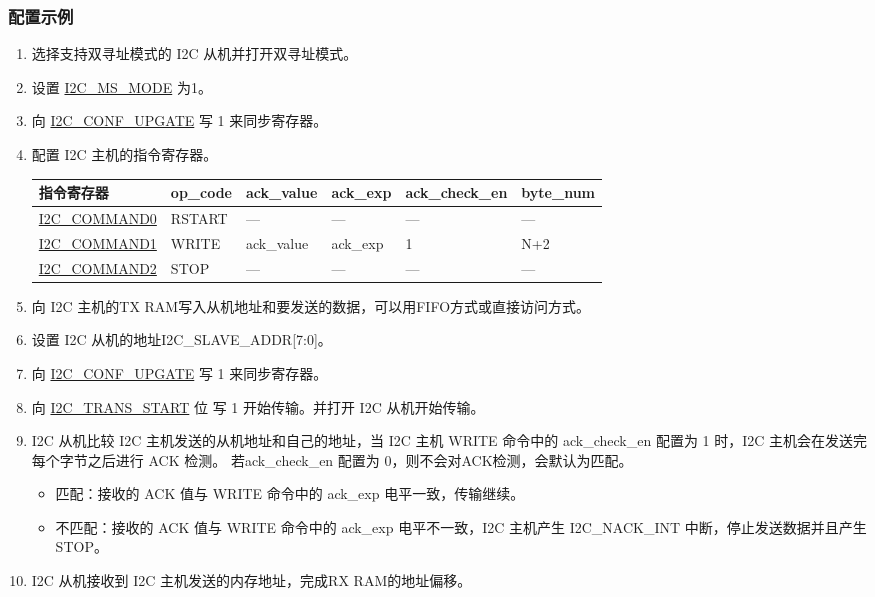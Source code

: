 \documentclass[main\_\_CN.tex]{subfiles}
\begin{document}
\subsubsection{配置示例}
\begin{enumerate}

\item 选择支持双寻址模式的 I2C 从机并打开双寻址模式。

\item 设置 \hyperref[fielddesc:I2CMSMODE]{I2C\_MS\_MODE} 为1。
\item 向 \hyperref[fielddesc:I2CCONFUPGATE]{I2C\_CONF\_UPGATE} 写 1 来同步寄存器。


\item 配置 I2C 主机的指令寄存器。
\begin{longtable}{ | p{4cm} | p{2cm} | p{2cm} | p{2cm} |p{2cm} | p{2cm} |}
\hline\rowcolor{lightgray}
指令寄存器& op\_code & ack\_value&ack\_exp&ack\_check\_en&byte\_num  \\ \hline
\hyperref[fielddesc:I2CCOMMAND0]{I2C\_COMMAND0} & RSTART& ---&---&---&---  \\ \hline
\hyperref[fielddesc:I2CCOMMAND1]{I2C\_COMMAND1} & WRITE& ack\_value&ack\_exp&1&N+2  \\ \hline
\hyperref[fielddesc:I2CCOMMAND2]{I2C\_COMMAND2} & STOP& ---&---&---&---  \\ \hline
\end{longtable}
\item 向 I2C 主机的TX RAM写入从机地址和要发送的数据，可以用FIFO方式或直接访问方式。

\item 设置 I2C 从机的地址I2C\_SLAVE\_ADDR[7:0]。

\item 向 \hyperref[fielddesc:I2CCONFUPGATE]{I2C\_CONF\_UPGATE} 写 1 来同步寄存器。
\item 向 \hyperref[fielddesc:I2CTRANSSTART]{I2C\_TRANS\_START} 位 写 1 开始传输。并打开 I2C 从机开始传输。

\item I2C 从机比较 I2C 主机发送的从机地址和自己的地址，当 I2C 主机 WRITE 命令中的 ack\_check\_en 配置为 1 时，I2C 主机会在发送完每个字节之后进行 ACK 检测。 若ack\_check\_en 配置为 0，则不会对ACK检测，会默认为匹配。
\begin{itemize}
\item 匹配：接收的 ACK 值与 WRITE 命令中的 ack\_exp 电平一致，传输继续。
\item 不匹配：接收的 ACK 值与 WRITE 命令中的 ack\_exp 电平不一致，I2C 主机产生 I2C\_NACK\_INT 中断，停止发送数据并且产生 STOP。
\end{itemize}
\item I2C 从机接收到 I2C 主机发送的内存地址，完成RX RAM的地址偏移。


\end{enumerate}
\end{document}
